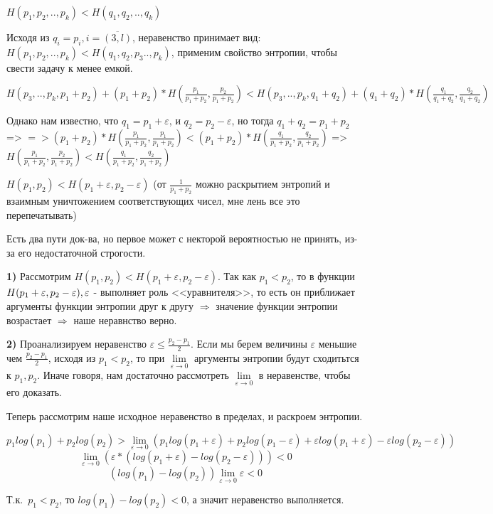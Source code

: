 \documentclass[../main.tex]{subfiles}
\begin{document}
$H(p_1, p_2, .., p_k) < H(q_1, q_2, .., q_k)$

Исходя из $q_i = p_i, i=\overline{(3,l)}$,  неравенство принимает вид: $H(p_1, p_2, .., p_k) < H(q_1, q_2, p_3 .., p_k)$, применим свойство энтропии, чтобы свести задачу к менее емкой. 

$H(p_3,.., p_k, p_1 + p_2) + (p_1+p_2)*H(\frac{p_1}{p_1+p_2}, \frac{p_2}{p_1+p_2}) < H(p_3,.., p_k, q_1 + q_2) + (q_1+q_2)*H(\frac{q_1}{q_1+q_2}, \frac{q_2}{q_1+q_2})$

Однако нам известно, что $q_1 = p_1 + \varepsilon$, и $q_2 = p_2 - \varepsilon$, но тогда $q_1+q_2=p_1+p_2$ => \newline
$=> (p_1+p_2)*H(\frac{p_1}{p_1+p_2},\frac{p_1}{p_1+p_2}) < (p_1+p_2)*H(\frac{q_1}{p_1+p_2}, \frac{q_2}{p_1+p_2})$ =>
$H(\frac{p_1}{p_1+p_2}, \frac{p_2}{p_1+p_2}) < H(\frac{q_1}{p_1+p_2}, \frac{q_2}{p_1+p_2})$

$H(p_1, p_2)<H(p_1+\varepsilon, p_2-\varepsilon)$ (от $\frac{1}{p_1+p_2}$ можно раскрытием энтропий и взаимным уничтожением соответствующих чисел, мне лень все это перепечатывать)

Есть два пути док-ва, но первое может с некторой вероятностью не принять, из-за его недостаточной строгости.

\textbf{1)} Рассмотрим $H(p_1, p_2)<H(p_1+\varepsilon, p_2-\varepsilon)$. Так как $p_1<p_2$, то в функции $H(p_1+\varepsilon, p_2-\varepsilon), \newline
\varepsilon$ - выполняет роль <<уравнителя>>, то есть он приближает аргументы функции энтропии друг к другу $\Rightarrow$ значение функции энтропии возрастает $\Rightarrow$ наше неравнство верно.

\textbf{2)} Проанализируем неравенство $\varepsilon \leq \frac{p_2-p_1}{2}$. Если мы берем величины $\varepsilon$ меньшие чем $\frac{p_2-p_1}{2}$, исходя из $p_1 < p_2$, то при $\lim\limits_{\varepsilon \rightarrow 0}$ аргументы энтропии будут сходитьтся к $p_1, p_2$. Иначе говоря, нам достаточно рассмотреть $\lim\limits_{\varepsilon \rightarrow 0}$ в неравенстве, чтобы его доказать. 

Теперь рассмотрим наше исходное неравенство в пределах, и раскроем энтропии.

$$p_1log(p_1) + p_2log(p_2) > \lim\limits_{\varepsilon\rightarrow 0}(p_1log(p_1+\varepsilon) + p_2log(p_1-\varepsilon) + \varepsilon log(p_1+\varepsilon) - \varepsilon log(p_2-\varepsilon))$$
$$\lim\limits_{\varepsilon\rightarrow 0}(\varepsilon*(log(p_1+\varepsilon) -log(p_2-\varepsilon)))<0$$
$$(log(p_1)-log(p_2))\lim\limits_{\varepsilon\rightarrow 0}\varepsilon<0$$

Т.к.\ $p_1<p_2$, то $log(p_1)-log(p_2) <0$, а значит неравенство выполняется.
\end{document}

